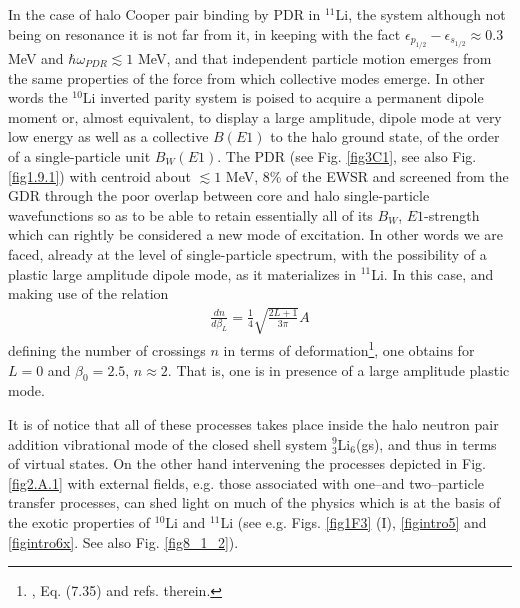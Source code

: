 \begin{subappendices}
In the case of halo Cooper pair binding by PDR in $^{11}$Li, the system although not being on resonance it is not far from it, in keeping with the fact $\epsilon_{p_{1/2}}-\epsilon_{s_{1/2}}\approx 0.3$ MeV and $\hbar\omega_{PDR}\lesssim1$ MeV, and that independent particle motion emerges from the same properties of the force from which collective modes emerge. In other words the $^{10}$Li inverted parity system is poised to acquire a permanent dipole moment or, almost equivalent, to display a large amplitude, dipole mode at very low energy as well as a collective $B(E1)$ to the halo ground state, of the order of a single-particle unit $B_{W}(E1)$. The PDR (see Fig. \ref{fig3C1}, see also Fig. \ref{fig1.9.1}) with centroid about $\lesssim 1$ MeV, 8\% of the EWSR and  screened from the GDR through the poor overlap between core and halo single-particle wavefunctions so as to be able to retain essentially all of its $B_{W}$, $E1$-strength which can rightly be considered a new mode of excitation. In other words we are faced, already at the level of single-particle spectrum, with the possibility of a plastic large amplitude dipole mode, as it materializes in $^{11}$Li. In this case, and making use of the relation 
\begin{align}\label{eq3C6}
\frac{dn}{d\beta_L}=\frac{1}{4}\sqrt{\frac{2L+1}{3\pi}}A
\end{align}  
defining the number of crossings $n$ in terms of deformation\footnote{\cite{Brink:05}, Eq. (7.35) and refs. therein.}, one obtains for $L=0$ and $\beta_0=2.5$, $n\approx 2$. That is, one is in presence of a large amplitude plastic mode.

 

 
It is of notice that all of these processes takes place inside the halo neutron pair addition vibrational mode of the closed shell system $^9_3$Li$_6$(gs), and thus in terms of virtual states. On the other hand intervening the processes depicted in Fig. \ref{fig2.A.1} with external fields, e.g. those associated with one--and two--particle transfer processes, can shed light on much of the physics which is at the basis of the exotic properties of $^{10}$Li and $^{11}$Li (see e.g. Figs. \ref{fig1F3} (I), \ref{figintro5} and \ref{figintro6x}. See also Fig. \ref{fig8_1_2}). 



\end{subappendices}
